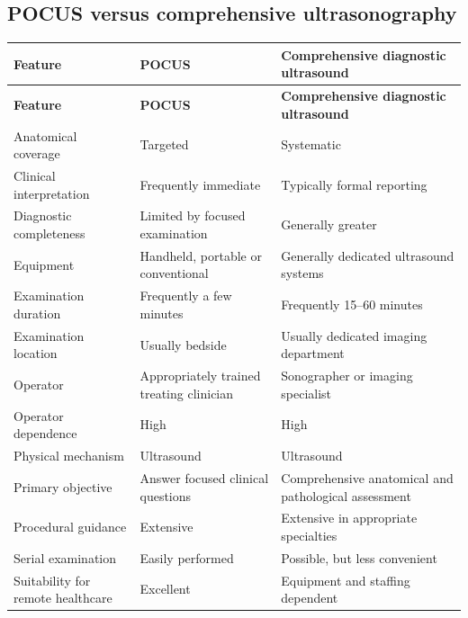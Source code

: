 \subsection{POCUS versus comprehensive ultrasonography}
\begin{longtable}{@{}p{}p{}p{}@{}}
\toprule
\textbf{Feature} & \textbf{POCUS} & \textbf{Comprehensive diagnostic ultrasound} \\
\midrule
\endfirsthead
\toprule
\textbf{Feature} & \textbf{POCUS} & \textbf{Comprehensive diagnostic ultrasound} \\
\midrule
\endhead
Anatomical coverage & Targeted & Systematic \\
Clinical interpretation & Frequently immediate & Typically formal reporting \\
Diagnostic completeness & Limited by focused examination & Generally greater \\
Equipment & Handheld, portable or conventional & Generally dedicated ultrasound systems \\
Examination duration & Frequently a few minutes & Frequently 15--60 minutes \\
Examination location & Usually bedside & Usually dedicated imaging department \\
Operator & Appropriately trained treating clinician & Sonographer or imaging specialist \\
Operator dependence & High & High \\
Physical mechanism & Ultrasound & Ultrasound \\
Primary objective & Answer focused clinical questions & Comprehensive anatomical and pathological assessment \\
Procedural guidance & Extensive & Extensive in appropriate specialties \\
Serial examination & Easily performed & Possible, but less convenient \\
Suitability for remote healthcare & Excellent & Equipment and staffing dependent \\
\bottomrule
\end{longtable}

